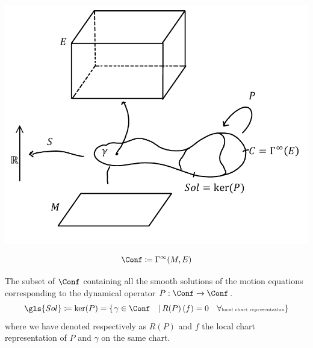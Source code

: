 \documentclass[a4paper,11pt]{scrartcl}
\begin{document}
		\begin{minipage}{0.5\textwidth}
			\includegraphics[width=\textwidth]{../Pictures/AbstractFieldTheory}
		\end{minipage}
		\begin{minipage}{0.5\textwidth}
			\begin{definition}
				\begin{displaymath}
					\Conf \coloneqq \Gamma^\infty(M,E)
				\end{displaymath}
			\end{definition}
			\begin{definition}\label{Def:SolSpace}
				The subset of $\Conf$ containing all the smooth solutions of the motion equations corresponding to the  dynamical operator 
				$P: \Conf \rightarrow \Conf$.
				\begin{displaymath}
					\gls{Sol} \coloneqq \ker(P) = \left\{\left. \gamma \in \Conf \quad\right\vert  R(P)\left(f\right) = 0 \quad \forall \textrm{\tiny local chart representation}\right\}
				\end{displaymath}
				where we have denoted respectively as $R(P)$ and $f$ the local chart representation of $P$ and $\gamma$ on the same chart.
			\end{definition}
		\end{minipage}
\end{document}
